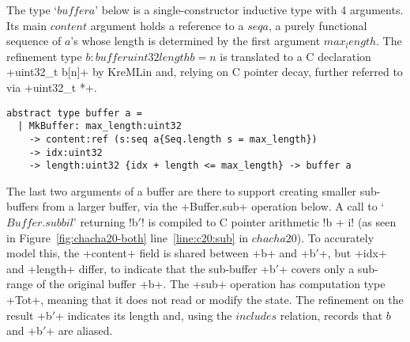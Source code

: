 The type `\lst$buffer a$' below is a single-constructor inductive type
with 4 arguments.
Its main \lst$content$ argument
holds a reference to a \lst$seq a$, a purely functional sequence of
\lst$a$'s whose length is determined by the first argument
\lst$max_length$. The refinement type \lst$b:buffer uint32{length b = n}$ is
translated to a C declaration \li+uint32_t b[n]+ by KreMLin and, relying on C
pointer decay, further referred to via \li+uint32_t *+.

\begin{lstlisting}[numbers=none]
abstract type buffer a =
  | MkBuffer: max_length:uint32
    -> content:ref (s:seq a{Seq.length s = max_length})
    -> idx:uint32
    -> length:uint32 {idx + length <= max_length} -> buffer a
\end{lstlisting}


\noindent 
The last two arguments of a buffer are there to support creating smaller
sub-buffers from a larger buffer, via the \li+Buffer.sub+ operation
below. A call to `\lst$Buffer.sub b i l$' returning \lst!b$'$! is compiled
to C pointer arithmetic \li!b + i! (as seen in
Figure~\ref{fig:chacha20-both} line~\ref{line:c20:sub} in
\lst$chacha20$). To accurately model this, the \li+content+ field is
shared between \li+b+ and \li+b$'$+, but \li+idx+ and \li+length+
differ, to indicate that the sub-buffer \li+b$'$+ covers only a
sub-range of the original buffer \li+b+. 
The \lst+sub+ operation has computation type \li+Tot+, meaning that it
does not read or modify the state. The refinement on the result
\lst+b$'$+ indicates its length and, using the \lst$includes$
relation, records that \lst$b$ and \lst+b$'$+ are aliased.



